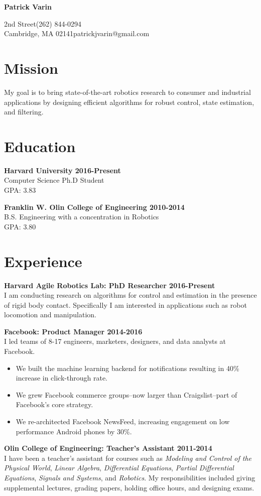 \documentclass{article}
\newcommand{\name}[1]{\begin{center}\huge\textbf{#1}\end{center}\vspace{2em}}
\newcommand{\personal}[4]{
	\noindent#1\hfill#3\\
	#2\hfill#4
}
\newcommand{\newitem}[2]{\noindent\textbf{#1 \hfill #2}\\}
\newcommand{\gimmespace}{\vspace{1em}}
\begin{document}
\name{Patrick Varin}
\personal{38 2nd Street}{Cambridge, MA 02141}{(262) 844-0294}{patrickjvarin@gmail.com}
\section*{Mission}
\noindent My goal is to bring state-of-the-art robotics research to consumer and industrial applications by designing efficient algorithms for robust control, state estimation, and filtering.

\section*{Education}
\newitem{Harvard University}{2016-Present}
Computer Science Ph.D Student\\
GPA: 3.83
\gimmespace

\newitem{Franklin W. Olin College of Engineering}{2010-2014}
B.S. Engineering with a concentration in Robotics\\
GPA: 3.80

\section*{Experience}

\newitem{Harvard Agile Robotics Lab: PhD Researcher}{2016-Present}
I am conducting research on algorithms for control and estimation in the presence of rigid body contact. Specifically I am interested in applications such as robot locomotion and manipulation.
\gimmespace

\newitem{Facebook: Product Manager}{2014-2016}
I led teams of 8-17 engineers, marketers, designers, and data analysts at Facebook.
\begin{itemize}
\item We built the machine learning backend for notifications resulting in 40\% increase in click-through rate.
\item We grew Facebook commerce groups--now larger than Craigslist--part of Facebook's core strategy.
\item We re-architected Facebook NewsFeed, increasing engagement on low performance Android phones by 30\%.
\end{itemize}
\gimmespace

\newitem{Olin College of Engineering: Teacher's Assistant}{2011-2014}
I have been a teacher's assistant for courses such as \emph{Modeling and Control of the Physical World}, \emph{Linear Algebra}, \emph{Differential Equations}, \emph{Partial Differential Equations}, \emph{Signals and Systems}, and \emph{Robotics}. My responsibilities included giving supplemental lectures, grading papers, holding office hours, and designing exams.
\gimmespace
\end{document}
